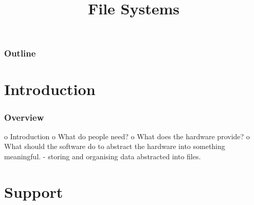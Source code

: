 %
%
%
%
%
%

%
%

%
%

\def\path{../../../..}

%
%



%
%

\title{File Systems}

%
%



%
%

\begin{frame}
  \titlepage
\end{frame}

%
%

\begin{frame}
  \frametitle{Outline}

  \tableofcontents
\end{frame}

%
%

%
%

\section{Introduction}


\begin{frame}
  \frametitle{Overview}

\end{frame}

o Introduction
 o What do people need?
 o What does the hardware provide?
 o What should the software do to abstract the hardware into something meaningful.
   - storing and organising data abstracted into files.

%
%

\section{Support}

